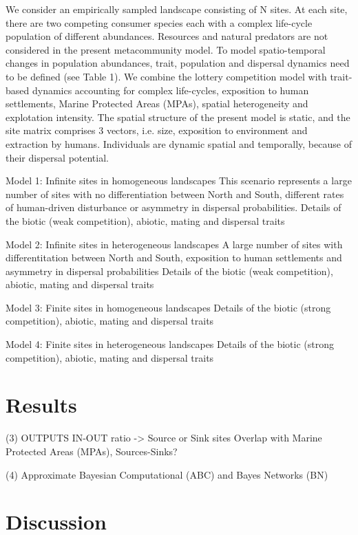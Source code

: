 \documentclass[12pt]{article}
\begin{document}
\begin{justify}
{{{{{We consider an empirically sampled landscape consisting of N sites. At each site, there are two competing consumer species each with a complex life-cycle population of different abundances. Resources and natural predators are not considered in the present metacommunity model. To model spatio-temporal changes in population abundances, trait, population and dispersal dynamics need to be defined (see Table 1). We combine the lottery competition model \citep{chesson1981environmental} with trait-based dynamics accounting for complex life-cycles, exposition to human settlements, Marine Protected Areas (MPAs), spatial heterogeneity and explotation intensity. The spatial structure of the present model is static, and the site matrix comprises 3 vectors, i.e. size, exposition to environment and extraction by humans. Individuals are dynamic spatial and temporally, because of their dispersal potential.

Model 1: Infinite sites in homogeneous landscapes
This scenario represents a large number of sites with no differentiation between North and South, different rates of human-driven disturbance or asymmetry in dispersal probabilities. Details of the biotic (weak competition), abiotic, mating and dispersal traits

Model 2: Infinite sites in heterogeneous landscapes 
A large number of sites with differentitation between North and South, exposition to human settlements and asymmetry in dispersal probabilities
Details of the biotic (weak competition), abiotic, mating and dispersal traits

Model 3: Finite sites in homogeneous landscapes 
Details of the biotic (strong competition), abiotic, mating and dispersal traits

Model 4: Finite sites in heterogeneous landscapes 
Details of the biotic (strong competition), abiotic, mating and dispersal traits

\section{Results}

(3) OUTPUTS
IN-OUT ratio -> Source or Sink sites
Overlap with Marine Protected Areas (MPAs), Sources-Sinks?

(4) Approximate Bayesian Computational (ABC) and Bayes Networks (BN)

\section{Discussion}

}}}}}
\end{justify}
\end{document}
